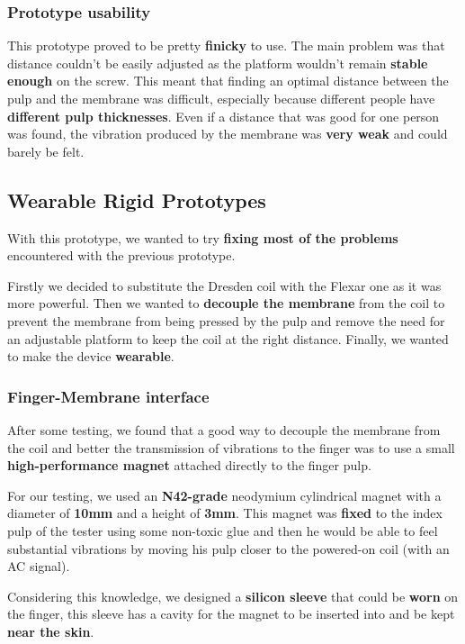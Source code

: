 \subsubsection{Prototype usability}
This prototype proved to be pretty \textbf{finicky} to use.
The main problem was that distance couldn't be easily adjusted as the platform wouldn't remain \textbf{stable enough} on the screw.
This meant that finding an optimal distance between the pulp and the membrane was difficult, especially because different people have \textbf{different pulp thicknesses}.
Even if a distance that was good for one person was found, the vibration produced by the membrane was \textbf{very weak} and could barely be felt.

\subsection{Wearable Rigid Prototypes}
With this prototype, we wanted to try \textbf{fixing most of the problems} encountered with the previous prototype.

Firstly we decided to substitute the Dresden coil with the Flexar one as it was more powerful.
Then we wanted to \textbf{decouple the membrane} from the coil to prevent the membrane from being pressed by the pulp and remove the need for an adjustable platform to keep the coil at the right distance.
Finally, we wanted to make the device \textbf{wearable}.

\subsubsection{Finger-Membrane interface}
After some testing, we found that a good way to decouple the membrane from the coil and better the transmission of vibrations to the finger was to use a small \textbf{high-performance magnet} attached directly to the finger pulp.

For our testing, we used an \textbf{N42-grade} neodymium cylindrical magnet with a diameter of \textbf{10mm} and a height of \textbf{3mm}.
This magnet was \textbf{fixed} to the index pulp of the tester using some non-toxic glue and then he would be able to feel substantial vibrations by moving his pulp closer to the powered-on coil (with an AC signal).

Considering this knowledge, we designed a \textbf{silicon sleeve} that could be \textbf{worn} on the finger, this sleeve has a cavity for the magnet to be inserted into and be kept \textbf{near the skin}.

